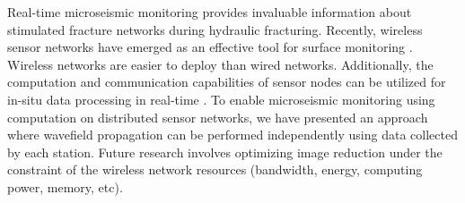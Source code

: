 
Real-time microseismic monitoring provides invaluable information about stimulated fracture networks during hydraulic fracturing. Recently, wireless sensor networks have emerged as an effective tool for surface monitoring \cite[]{SHXM-MOBISYS2009}. Wireless networks are easier to deploy than wired networks. Additionally, the computation and communication capabilities of sensor nodes can be utilized for in-situ data processing in real-time \cite[]{KSS-DCOSS2013,SLK-SEG2015}. To enable microseismic monitoring using computation on distributed sensor networks, we have presented an approach where wavefield propagation can be performed independently using data collected by each station. Future research involves optimizing image reduction under the constraint of the wireless network resources (bandwidth, energy, computing power, memory, etc).


